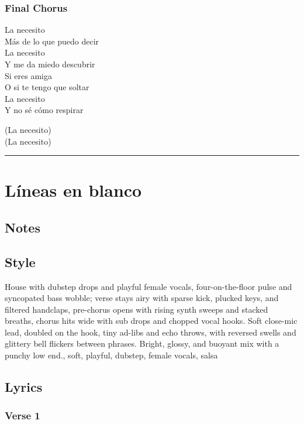 \documentclass[]{article}
\begin{document}
\subsubsection{Final Chorus}\label{final-chorus-1}

La necesito\\
Más de lo que puedo decir\\
La necesito\\
Y me da miedo descubrir\\
Si eres amiga\\
O si te tengo que soltar\\
La necesito\\
Y no sé cómo respirar

(La necesito)\\
(La necesito)

\begin{center}\rule{0.5\linewidth}{0.5pt}\end{center}

\section{Líneas en blanco}\label{luxedneas-en-blanco}

\subsection{Notes}\label{notes-24}

\subsection{Style}\label{style-24}

House with dubstep drops and playful female vocals, four-on-the-floor
pulse and syncopated bass wobble; verse stays airy with sparse kick,
plucked keys, and filtered handclaps, pre-chorus opens with rising synth
sweeps and stacked breaths, chorus hits wide with sub drops and chopped
vocal hooks. Soft close-mic lead, doubled on the hook, tiny ad-libs and
echo throws, with reversed swells and glittery bell flickers between
phrases. Bright, glossy, and buoyant mix with a punchy low end., soft,
playful, dubstep, female vocals, salsa

\subsection{Lyrics}\label{lyrics-24}

\subsubsection{Verse 1}\label{verse-1-15}
\end{document}
